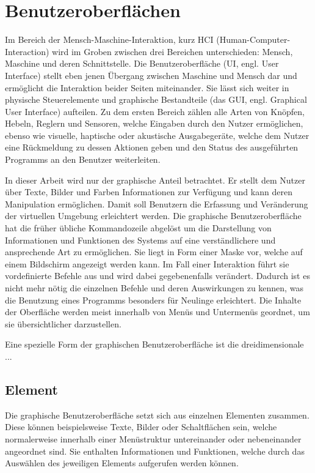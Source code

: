 	\section{Benutzeroberflächen}
		Im Bereich der Mensch-Maschine-Interaktion, kurz HCI (Human-Computer-Interaction) wird im Groben zwischen drei Bereichen unterschieden: Mensch, Maschine und deren Schnittstelle.\linebreak
		Die Benutzeroberfläche (UI, engl. User Interface) stellt eben jenen Übergang zwischen Maschine und Mensch dar und ermöglicht die Interaktion beider Seiten miteinander.
		Sie lässt sich weiter in physische Steuerelemente und graphische Bestandteile (das GUI, engl. Graphical User Interface) aufteilen. Zu dem ersten Bereich zählen alle Arten von Knöpfen, Hebeln, Reglern und Sensoren, welche Eingaben durch den Nutzer ermöglichen, ebenso wie visuelle, haptische oder akustische Ausgabegeräte, welche dem Nutzer eine Rückmeldung zu dessen Aktionen geben und den Status des ausgeführten Programms an den Benutzer weiterleiten.
		
		
		In dieser Arbeit wird nur der graphische Anteil betrachtet. Er stellt dem Nutzer über Texte, Bilder und Farben Informationen zur Verfügung und kann deren Manipulation ermöglichen. Damit soll Benutzern die Erfassung und Veränderung der virtuellen Umgebung erleichtert werden.
		Die graphische Benutzeroberfläche hat die früher übliche Kommandozeile abgelöst um die Darstellung von Informationen und Funktionen des Systems auf eine verständlichere und ansprechende Art zu ermöglichen. Sie liegt in Form einer Maske vor, welche auf einem Bildschirm angezeigt werden kann. Im Fall einer Interaktion führt sie vordefinierte Befehle aus und wird dabei gegebenenfalls verändert. Dadurch ist es nicht mehr nötig die einzelnen Befehle und deren Auswirkungen zu kennen, was die Benutzung eines Programms besonders für Neulinge erleichtert.
		Die Inhalte der Oberfläche werden meist innerhalb von Menüs und Untermenüs geordnet, um sie übersichtlicher darzustellen.
		
		Eine spezielle Form der graphischen Benutzeroberfläche ist die dreidimensionale ...
	
		\subsection{Element}
			Die graphische Benutzeroberfläche setzt sich aus einzelnen Elementen zusammen. Diese können beispielsweise Texte, Bilder oder Schaltflächen sein, welche normalerweise innerhalb einer Menüstruktur untereinander oder nebeneinander angeordnet sind. Sie enthalten Informationen und Funktionen, welche durch das Auswählen des jeweiligen Elements aufgerufen werden können.
	
